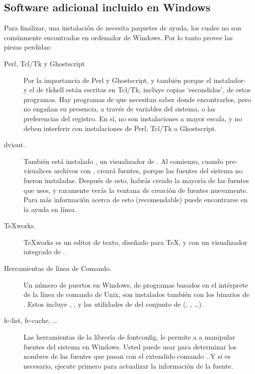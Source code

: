 \documentclass{article}
\begin{document}
\subsection{Software adicional incluido en Windows}
Para finalizar, una instalación de \TL{} necesita paquetes de ayuda, los cuales no
son comúnmente encontrados en ordenador de Windows. Por lo tanto \TL{} provee las
piezas perdidas:

\begin{description} 
\item[Perl, Tcl/Tk y Ghostscript] Por la importancia de Perl
	y Ghostscript, y también porque el instalador-
	y el \GUI{} de tlshell están escritas en Tcl/Tk, \TL{} incluye
	copias `escondidas', de estos programas. Hay programas de \TL{} 			que necesitan saber donde encontrarlos, pero no engañan su presencia, a través
	de variables del sistema, o las preferencias del registro. En sí, no son
	instalaciones a mayor escala, y no deben interferir con instalaciones de
	Perl, Tcl/Tk o Ghostscript.

\item[dviout.] También está instalado , un visualizador de
	. Al comienzo, cuando pre-visualices archivos con
	, creará fuentes, porque las fuentes del
	sistema no fueron instaladas. Después de esto, habrás
	creado la mayoría de las fuentes que uses, y raramente
	verás la ventana de creación de fuentes nuevamente. Para
	más información acerca de esto (recomendable) puede
	encontrarse en la ayuda en línea. 

\item[\TeX{}works.] \TeX{}works es un editor de texto, diseñado para
	\TeX{}, y con un visualizador integrado de .

\item[Herramientas de línea de Comando.] Un número de puertos en
	Windows, de programas basados en el intérprete de la línea de
	comando de Unix, son instalados también con los binarios
	de \TL{}. Estos incluye , ,
	y las utilidades de del conjunto de 
	(, , \ldots).

\item[fc-list, fc-cache, \ldots] Las herramientas de la librería de
	fontconfig, le permite a \XeTeX{} a manipular fuentes del
	sistema en Windows. Usted puede usar  para
	determinar los nombres de las fuentes que pasan con el
	extendido comando . Y si es necesario, ejecute
	 primero para actualizar la información
	de la fuente.
\end{description}
\end{document}
